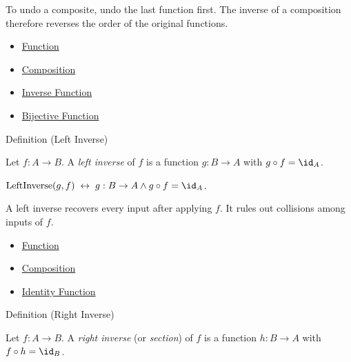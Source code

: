 \begin{remark*}[Interpretation]
To undo a composite, undo the last function first. The inverse of a composition
therefore reverses the order of the original functions.
\end{remark*}

\begin{dependencies}
\begin{itemize}
  \item \hyperref[def:function]{Function}
  \item \hyperref[def:composition]{Composition}
  \item \hyperref[def:inverse]{Inverse Function}
  \item \hyperref[def:bijective]{Bijective Function}
\end{itemize}
\end{dependencies}

\begin{definitionbox}{Definition (Left Inverse)}
\begin{definition}\label{def:left-inverse-function}
Let $f : A \to B$.
A \emph{left inverse} of $f$ is a function $g : B \to A$ with $g \circ f = \id_A$.
\end{definition}
\end{definitionbox}

\begin{remark*}
$\operatorname{LeftInverse}(g,f)\;\leftrightarrow\; g:B\to A \wedge
g\circ f=\id_A$.
\end{remark*}

\begin{remark*}[Interpretation]
A left inverse recovers every input after applying $f$. It rules out collisions
among inputs of $f$.
\end{remark*}

\begin{dependencies}
\begin{itemize}
  \item \hyperref[def:function]{Function}
  \item \hyperref[def:composition]{Composition}
  \item \hyperref[def:identity]{Identity Function}
\end{itemize}
\end{dependencies}

\begin{definitionbox}{Definition (Right Inverse)}
\begin{definition}\label{def:right-inverse-function}
Let $f : A \to B$.
A \emph{right inverse} (or \emph{section}) of $f$ is a function $h : B \to A$
with $f \circ h = \id_B$.
\end{definition}
\end{definitionbox}

